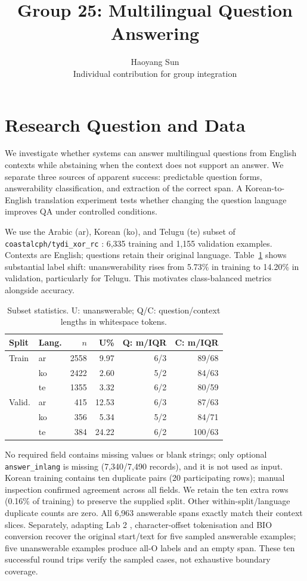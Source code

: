 \documentclass[11pt]{article}
\title{Group 25: Multilingual Question Answering}
\author{Haoyang Sun \\ Individual contribution for group integration}
\begin{document}
\maketitle
\section{Research Question and Data}
We investigate whether systems can answer multilingual questions from English contexts while abstaining when the context does not support an answer. We separate three sources of apparent success: predictable question forms, answerability classification, and extraction of the correct span. A Korean-to-English translation experiment tests whether changing the question language improves QA under controlled conditions.

We use the Arabic (ar), Korean (ko), and Telugu (te) subset of \texttt{coastalcph/tydi\_xor\_rc} \citep{dataset}: 6,335 training and 1,155 validation examples. Contexts are English; questions retain their original language. Table~\ref{tab:data} shows substantial label shift: unanswerability rises from 5.73\% in training to 14.20\% in validation, particularly for Telugu. This motivates class-balanced metrics alongside accuracy.

\begin{table}[ht]
\centering\small\setlength{\tabcolsep}{5pt}
\begin{tabular}{llrrrr}
\toprule
Split & Lang. & $n$ & U\% & Q: m/IQR & C: m/IQR\\
\midrule
Train & ar & 2558 & 9.97 & 6/3 & 89/68\\
& ko & 2422 & 2.60 & 5/2 & 84/63\\
& te & 1355 & 3.32 & 6/2 & 80/59\\
Valid. & ar & 415 & 12.53 & 6/3 & 87/63\\
& ko & 356 & 5.34 & 5/2 & 84/71\\
& te & 384 & 24.22 & 6/2 & 100/63\\
\bottomrule
\end{tabular}
\caption{Subset statistics. U: unanswerable; Q/C: question/context lengths in whitespace tokens.}
\label{tab:data}
\end{table}

No required field contains missing values or blank strings; only optional \texttt{answer\_inlang} is missing (7,340/7,490 records), and it is not used as input. Korean training contains ten duplicate pairs (20 participating rows); manual inspection confirmed agreement across all fields. We retain the ten extra rows (0.16\% of training) to preserve the supplied split. Other within-split/language duplicate counts are zero. All 6,963 answerable spans exactly match their context slices. Separately, adapting Lab 2 \citep{lab2}, character-offset tokenisation and BIO conversion recover the original start/text for five sampled answerable examples; five unanswerable examples produce all-O labels and an empty span. These ten successful round trips verify the sampled cases, not exhaustive boundary coverage.
\end{document}
